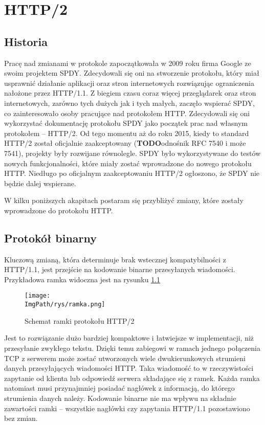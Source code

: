 \documentclass[a4paper,12pt,twoside,openany]{report}
\newcommand{\ImgPath}{.}
\newcommand{\TODO}{\textbf{TODO}}
\begin{document}
\chapter{HTTP/2}

\section{Historia}
\label{sectionHistoria}
Pracę nad zmianami w protokole zapoczątkowała w 2009 roku firma Google ze swoim projektem SPDY.
Zdecydowali się oni na stworzenie protokołu, który miał usprawnić działanie aplikacji oraz stron internetowych rozwiązując ograniczenia nałożone przez HTTP/1.1.
Z biegiem czasu coraz więcej przeglądarek oraz stron internetowych, zarówno tych dużych jak i tych małych, zaczęło wspierać SPDY, co zainteresowało osoby pracujące nad protokołem HTTP.
Zdecydowali się oni wykorzystać dokumentację protokołu SPDY jako początek prac nad własnym protokołem -- HTTP/2.
Od tego momentu aż do roku 2015, kiedy to standard HTTP/2 został oficjalnie zaakceptowany 
(\TODO odnośnik RFC 7540 i może 7541), projekty były rozwijane równolegle.
SPDY było wykorzystywane do testów nowych funkcjonalności, które miały zostać wprowadzone do nowego protokołu HTTP.
Niedługo po oficjalnym zaakceptowaniu HTTP/2 ogłoszono, że SPDY nie będzie dalej wspierane.

W kilku poniższych akapitach postaram się przybliżyć zmiany, które zostały wprowadzone do protokołu HTTP.

\section{Protokół binarny}
\label{sectionProtokolBinarny}

Kluczową zmianą, która determinuje brak wstecznej kompatybilności z HTTP/1.1, jest przejście na kodowanie binarne przesyłanych wiadomości. Przykładowa ramka widoczna jest na rysunku \ref{schematRamki}
\begin{figure}[!htbp]
	\begin{center}
\centering
\texttt{[image: \\ImgPath/rys/ramka.png]}
\end{center}
	\caption{Schemat ramki protokołu HTTP/2}
	\label{schematRamki}
\end{figure}
Jest to rozwiązanie dużo bardziej kompaktowe i łatwiejsze w implementacji, niż przesyłanie zwykłego tekstu.
Dzięki temu zabiegowi w ramach jednego połączenia TCP z serwerem może zostać utworzonych wiele dwukierunkowych strumieni danych przesyłających wiadomości HTTP.
Taka wiadomość to w rzeczywistości zapytanie od klienta lub odpowiedź serwera składające się z ramek.
Każda ramka natomiast musi przynajmniej posiadać nagłówek z informacją, do którego strumienia danych należy.
Kodowanie binarne nie ma wpływu na składnie zawartości ramki -- wszystkie nagłówki czy zapytania HTTP/1.1 pozostawiono bez zmian.
\end{document}

